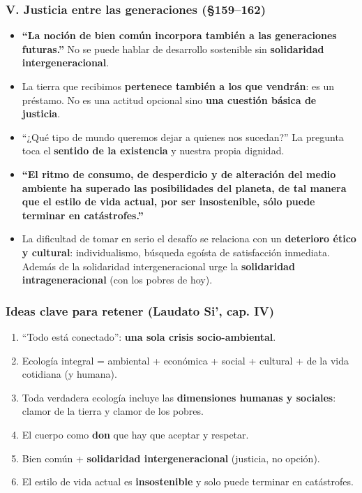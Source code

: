 \documentclass[10pt,a4paper]{article}
\begin{document}
\subsubsection{V. Justicia entre las generaciones (\S{}159--162)}
\begin{itemize}
\item \textbf{``La noción de bien común incorpora también a las generaciones futuras.''} No se puede hablar de desarrollo sostenible sin \textbf{solidaridad intergeneracional}.
\item La tierra que recibimos \textbf{pertenece también a los que vendrán}: es un préstamo. No es una actitud opcional sino \textbf{una cuestión básica de justicia}.
\item ``¿Qué tipo de mundo queremos dejar a quienes nos sucedan?'' La pregunta toca el \textbf{sentido de la existencia} y nuestra propia dignidad.
\item \textbf{``El ritmo de consumo, de desperdicio y de alteración del medio ambiente ha superado las posibilidades del planeta, de tal manera que el estilo de vida actual, por ser insostenible, sólo puede terminar en catástrofes.''}
\item La dificultad de tomar en serio el desafío se relaciona con un \textbf{deterioro ético y cultural}: individualismo, búsqueda egoísta de satisfacción inmediata. Además de la solidaridad intergeneracional urge la \textbf{solidaridad intrageneracional} (con los pobres de hoy).
\end{itemize}

\subsubsection{Ideas clave para retener (Laudato Si', cap. IV)}
\begin{enumerate}
\item ``Todo está conectado'': \textbf{una sola crisis socio-ambiental}.
\item Ecología integral = ambiental + económica + social + cultural + de la vida cotidiana (y humana).
\item Toda verdadera ecología incluye las \textbf{dimensiones humanas y sociales}: clamor de la tierra y clamor de los pobres.
\item El cuerpo como \textbf{don} que hay que aceptar y respetar.
\item Bien común + \textbf{solidaridad intergeneracional} (justicia, no opción).
\item El estilo de vida actual es \textbf{insostenible} y solo puede terminar en catástrofes.
\end{enumerate}
\end{document}
